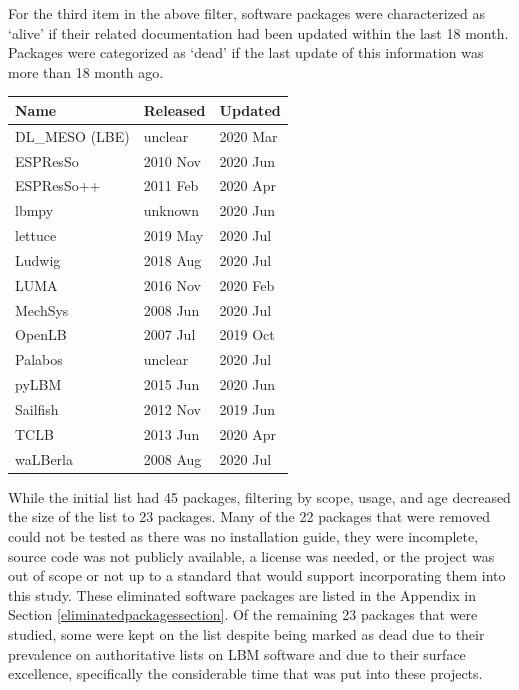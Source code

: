 \documentclass[12pt, notitlepage]{article}
\begin{document}
For the third item in the above filter, software packages were characterized as `alive' if their related documentation had been updated within
the last 18 month. Packages were categorized as `dead' if the last update of this information was more than 18 month ago.\\ 

\begin{center}
	\begin{tabular}{ p{4cm}p{3cm}p{3cm} }
		\hline
		Name & Released & Updated\\
		\hline
		DL\_MESO (LBE) & unclear & 2020 Mar\\
		ESPResSo & 2010 Nov & 2020 Jun\\
		ESPResSo++ & 2011 Feb & 2020 Apr\\
		lbmpy& unknown  & 2020 Jun  \\
		lettuce & 2019 May & 2020 Jul\\
		Ludwig& 2018 Aug & 2020 Jul\\
		LUMA& 2016 Nov   & 2020 Feb\\
		MechSys & 2008 Jun    & 2020 Jul\\
		OpenLB & 2007 Jul & 2019 Oct\\
		Palabos & unclear & 2020 Jul\\
		pyLBM & 2015 Jun&   2020 Jun\\
		Sailfish & 2012 Nov & 2019 Jun\\
		TCLB & 2013 Jun  & 2020 Apr\\
		waLBerla & 2008 Aug & 2020 Jul\\
		\hline
	\end{tabular}
	\label{alivepackages}
\end{center}

While the initial list had 45 packages, filtering by scope, usage, and age decreased the size of the list to 23 packages. Many of the 22 packages that were removed could not be tested as there was no installation guide, they were incomplete, source code was not publicly available, a license was needed, or the project was out of scope or not up to a standard that would support incorporating them into this study. These eliminated software packages are listed in the Appendix in Section \ref{eliminatedpackagessection}. Of the remaining 23 packages that were studied, some were kept on the list despite being marked as dead due to their prevalence on authoritative lists on LBM software and due to their surface excellence, specifically the considerable time that was put into these projects.  
\end{document}
